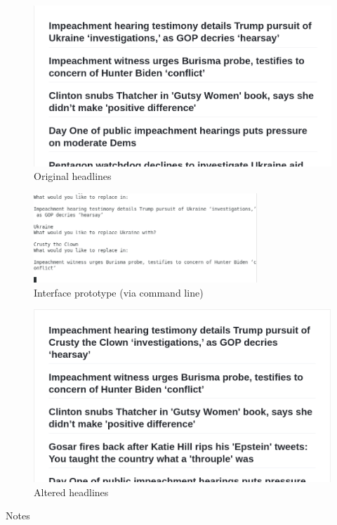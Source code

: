 \documentclass[12pt]{article}
\begin{document}
\begin{flushleft}
    \begin{figure}[H]
        \includegraphics{ukraine.png}
        \centering
        \caption{Original headlines}
    \end{figure}
    \begin{figure}[H]
        \includegraphics[width=0.75\textwidth]{input.png}
        \centering
        \caption{Interface prototype (via command line)}
    \end{figure}
    \begin{figure}[H]
        \includegraphics{crusty.png}
        \centering
        \caption{Altered headlines}
    \end{figure}

\begin{center}
Notes
\end{center}



\end{flushleft}
\end{document}
